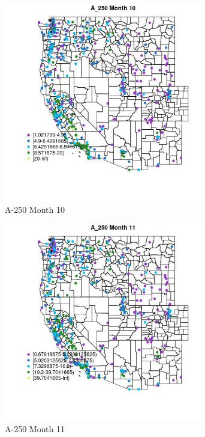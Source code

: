 \begin{figure} 
\centering  
\includegraphics[width=0.77\textwidth]{Code_Outputs/ML_input_report_ML_input_PM25_Step5_part_d_de_duplicated_aves_ML_input_MapObsMo10A_250.jpg} 
\caption{\label{fig:ML_input_report_ML_input_PM25_Step5_part_d_de_duplicated_aves_ML_inputMapObsMo10A_250}A-250 Month 10} 
\end{figure} 
 

\begin{figure} 
\centering  
\includegraphics[width=0.77\textwidth]{Code_Outputs/ML_input_report_ML_input_PM25_Step5_part_d_de_duplicated_aves_ML_input_MapObsMo11A_250.jpg} 
\caption{\label{fig:ML_input_report_ML_input_PM25_Step5_part_d_de_duplicated_aves_ML_inputMapObsMo11A_250}A-250 Month 11} 
\end{figure} 
 

